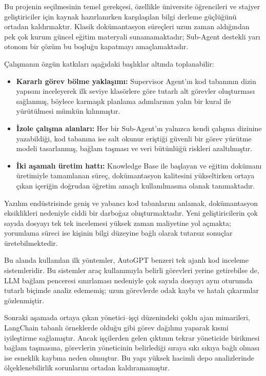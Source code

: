     Bu projenin seçilmesinin temel gerekçesi, özellikle üniversite öğrencileri ve stajyer geliştiriciler için kaynak hazırlanırken karşılaşılan bilgi derleme güçlüğünü ortadan kaldırmaktır. Klasik dokümantasyon süreçleri uzun zaman aldığından pek çok kurum güncel eğitim materyali sunamamaktadır; Sub-Agent destekli yarı otonom bir çözüm bu boşluğu kapatmayı amaçlamaktadır.

Çalışmanın özgün katkıları aşağıdaki başlıklar altında toplanabilir:
\begin{itemize}
        \item \textbf{Kararlı görev bölme yaklaşımı:} Supervisor Agent'ın kod tabanının dizin yapısını inceleyerek ilk seviye klasörlere göre tutarlı alt görevler oluşturması sağlanmış, böylece karmaşık planlama adımlarının yalın bir kural ile yürütülmesi mümkün kılınmıştır.
        \item \textbf{İzole çalışma alanları:} Her bir Sub-Agent'ın yalnızca kendi çalışma dizinine yazabildiği, kod tabanına ise salt okunur eriştiği güvenli bir görev yürütme modeli tasarlanmış, bağlam taşması ve veri bütünlüğü riskleri azaltılmıştır.
        \item \textbf{İki aşamalı üretim hattı:} Knowledge Base ile başlayan ve eğitim dokümanı üretimiyle tamamlanan süreç, dokümantasyon kalitesini yükseltirken ortaya çıkan içeriğin doğrudan öğretim amaçlı kullanılmasına olanak tanımaktadır.
\end{itemize}






Yazılım endüstrisinde geniş ve yabancı kod tabanlarını anlamak, dokümantasyon eksiklikleri nedeniyle ciddi bir darboğaz oluşturmaktadır. Yeni geliştiricilerin çok sayıda dosyayı tek tek incelemesi yüksek zaman maliyetine yol açmakta; yorumlama süreci ise kişinin bilgi düzeyine bağlı olarak tutarsız sonuçlar üretebilmektedir.

Bu alanda kullanılan ilk yöntemler, AutoGPT benzeri tek ajanlı kod inceleme sistemleridir. Bu sistemler araç kullanımıyla belirli görevleri yerine getirebilse de, LLM bağlam penceresi sınırlaması nedeniyle çok sayıda dosyayı aynı oturumda tutarlı biçimde analiz edememiş; uzun görevlerde odak kaybı ve hatalı çıkarımlar gözlenmiştir.

Sonraki aşamada ortaya çıkan yönetici–işçi düzenindeki çoklu ajan mimarileri, LangChain tabanlı örneklerde olduğu gibi görev dağılımı yaparak kısmi iyileştirme sağlamıştır. Ancak işçilerden gelen çıktının tekrar yöneticide birikmesi bağlam taşmasına, görevlerin yöneticinin belirlediği sıraya sıkı sıkıya bağlı olması ise esneklik kaybına neden olmuştur. Bu yapı yüksek hacimli depo analizlerinde ölçeklenebilirlik sorunlarını ortadan kaldıramamıştır.

